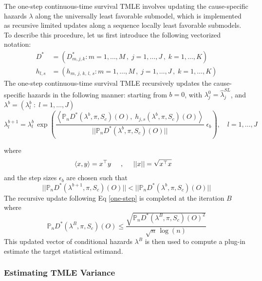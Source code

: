 \documentclass{report}
\newcommand{\1}{\ensuremath{\mathbf{1}}}
\newcommand{\lj}{\ensuremath{l}}
\newcommand{\jj}{\ensuremath{j}}
\newcommand{\g}{\ensuremath{\pi}}
\begin{document}
The one-step continuous-time survival TMLE involves updating the cause-specific hazards \(\lambda\) along the universally least favorable submodel, which is implemented as recursive limited updates along a sequence locally least favorable submodels. To describe this procedure, let us first introduce the following vectorized notation:
\begin{align*}
{D}^{*} &= \left(D^*_{m, \jj, k} : m = 1,\dots,M \,,\; \jj=1,\dots,J \,,\; k=1,\dots,K\right)\\
h_{\lj, s} &= \left(h_{m,\, \jj,\, k,\, \lj,\, s} : m = 1,\dots,M \,,\; \jj=1,\dots,J \,,\; k=1,\dots,K\right)
\end{align*}
The one-step continuous-time survival TMLE recursively updates the cause-specific hazards in the following manner: starting from \(b=0\), with \(\lambda^0_j = \hat{\lambda}^{SL}_j\), and \(\lambda^b = \left(\lambda^b_l \;:\; l = 1, \dots, J\right)\)
\begin{equation}
\lambda^{b+1}_{l} = \lambda^{b}_l \, \exp \left( \frac{\left<\mathbb{P}_n {D}^*( \lambda^b, \g,  S_c)(O),\; h_{j, s}( \lambda^b, \g,  S_c)(O) \right>}{|| \mathbb{P}_n {D}^*( \lambda^b, \g, S_c)(O)||} \; \epsilon_b\right), \quad l = 1,\dots,J \label{one-step}
\end{equation}

where
\begin{align*}
\left<x , y \right>& = x^\top y \hspace{.5cm}, \hspace{.5cm} ||x|| = \sqrt{x^\top x}
\end{align*}
and the step sizes \(\epsilon_b\) are chosen such that
\[|| \mathbb{P}_n {D}^*( \lambda^{b+1}, \g, S_c)(O)|| < || \mathbb{P}_n {D}^*( \lambda^{b}, \g, S_c)(O)||\]
The recursive update following Eq \eqref{one-step} is completed at the iteration \(B\) where
\begin{equation}
\mathbb{P}_n {D}^*( \lambda^B, \g, S_c)(O) \leq \frac{\sqrt{\mathbb{P}_n {D}^*( \lambda^B, \g, S_c)(O)^2}}{\sqrt{n} \, \log(n)} \label{one-step-stop}
\end{equation}
This updated vector of conditional hazards \(\lambda^B\) is then used to compute a plug-in estimate the target statistical estimand. 

\subsubsection{Estimating TMLE Variance}
\label{sec:orgcc62a91}
\end{document}
